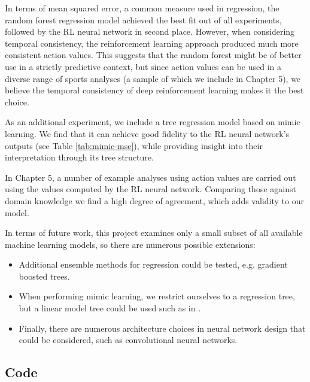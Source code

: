 \documentclass{sfuthesis}
\begin{document}
	In terms of mean squared error, a common measure used in regression, the random forest regression model achieved the best fit out of all experiments, followed by the RL neural network in second place. However, when considering temporal consistency, the reinforcement learning approach produced much more consistent action values. This suggests that the random forest might be of better use in a strictly predictive context, but since action values can be used in a diverse range of sports analyses (a sample of which we include in Chapter 5), we believe the temporal consistency of deep reinforcement learning makes it the best choice.
	
	As an additional experiment, we include a tree regression model based on mimic learning. We find that it can achieve good fidelity to the RL neural network's outputs (see Table \ref{tab:mimic-mse}), while providing insight into their interpretation through its tree structure.
	
	In Chapter 5, a number of example analyses using action values are carried out using the values computed by the RL neural network. Comparing those against domain knowledge we find a high degree of agreement, which adds validity to our model.
	
	In terms of future work, this project examines only a small subset of all available machine learning models, so there are numerous possible extensions:
	\begin{itemize}
		\item Additional ensemble methods for regression could be tested, e.g. gradient boosted trees.
		\item When performing mimic learning, we restrict ourselves to a regression tree, but a linear model tree could be used such as in \cite{sun2020cracking}.
		\item Finally, there are numerous architecture choices in neural network design that could be considered, such as convolutional neural networks.
	\end{itemize}  
	
	
	\backmatter%
	
	
	
	\begin{appendices} %
		\chapter{Code}
	\end{appendices}
\end{document}
